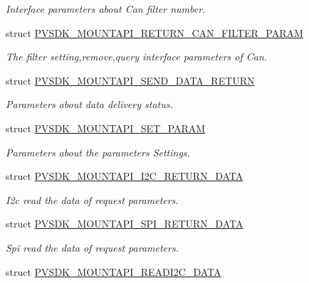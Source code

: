 \begin{DoxyCompactItemize}
\begin{DoxyCompactList}\small\item\em Interface parameters about Can filter number. \end{DoxyCompactList}\item 
struct \hyperlink{struct_p_v_s_d_k___m_o_u_n_t_a_p_i___r_e_t_u_r_n___c_a_n___f_i_l_t_e_r___p_a_r_a_m}{P\+V\+S\+D\+K\+\_\+\+M\+O\+U\+N\+T\+A\+P\+I\+\_\+\+R\+E\+T\+U\+R\+N\+\_\+\+C\+A\+N\+\_\+\+F\+I\+L\+T\+E\+R\+\_\+\+P\+A\+R\+AM}
\begin{DoxyCompactList}\small\item\em The filter setting,remove,query interface parameters of Can. \end{DoxyCompactList}\item 
struct \hyperlink{struct_p_v_s_d_k___m_o_u_n_t_a_p_i___s_e_n_d___d_a_t_a___r_e_t_u_r_n}{P\+V\+S\+D\+K\+\_\+\+M\+O\+U\+N\+T\+A\+P\+I\+\_\+\+S\+E\+N\+D\+\_\+\+D\+A\+T\+A\+\_\+\+R\+E\+T\+U\+RN}
\begin{DoxyCompactList}\small\item\em Parameters about data delivery status. \end{DoxyCompactList}\item 
struct \hyperlink{struct_p_v_s_d_k___m_o_u_n_t_a_p_i___s_e_t___p_a_r_a_m}{P\+V\+S\+D\+K\+\_\+\+M\+O\+U\+N\+T\+A\+P\+I\+\_\+\+S\+E\+T\+\_\+\+P\+A\+R\+AM}
\begin{DoxyCompactList}\small\item\em Parameters about the parameters Settings. \end{DoxyCompactList}\item 
struct \hyperlink{struct_p_v_s_d_k___m_o_u_n_t_a_p_i___i2_c___r_e_t_u_r_n___d_a_t_a}{P\+V\+S\+D\+K\+\_\+\+M\+O\+U\+N\+T\+A\+P\+I\+\_\+\+I2\+C\+\_\+\+R\+E\+T\+U\+R\+N\+\_\+\+D\+A\+TA}
\begin{DoxyCompactList}\small\item\em I2c read the data of request parameters. \end{DoxyCompactList}\item 
struct \hyperlink{struct_p_v_s_d_k___m_o_u_n_t_a_p_i___s_p_i___r_e_t_u_r_n___d_a_t_a}{P\+V\+S\+D\+K\+\_\+\+M\+O\+U\+N\+T\+A\+P\+I\+\_\+\+S\+P\+I\+\_\+\+R\+E\+T\+U\+R\+N\+\_\+\+D\+A\+TA}
\begin{DoxyCompactList}\small\item\em Spi read the data of request parameters. \end{DoxyCompactList}\item 
struct \hyperlink{struct_p_v_s_d_k___m_o_u_n_t_a_p_i___r_e_a_d_i2_c___d_a_t_a}{P\+V\+S\+D\+K\+\_\+\+M\+O\+U\+N\+T\+A\+P\+I\+\_\+\+R\+E\+A\+D\+I2\+C\+\_\+\+D\+A\+TA}

\end{DoxyCompactItemize}
